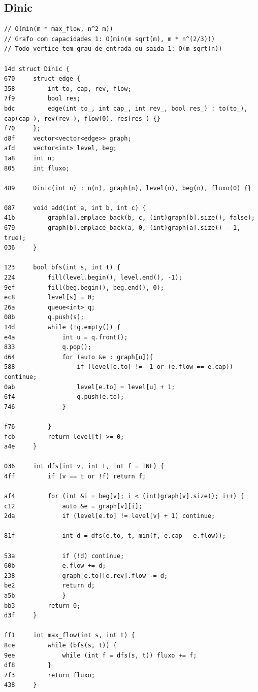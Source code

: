 \documentclass[11pt, a4paper, twoside]{article}
\begin{document}
\subsection{Dinic}
\begin{lstlisting}
// O(min(m * max_flow, n^2 m))
// Grafo com capacidades 1: O(min(m sqrt(m), m * n^(2/3)))
// Todo vertice tem grau de entrada ou saida 1: O(m sqrt(n))

14d struct Dinic {
670     struct edge { 
358         int to, cap, rev, flow;
7f9         bool res; 
bdc         edge(int to_, int cap_, int rev_, bool res_) : to(to_), cap(cap_), rev(rev_), flow(0), res(res_) {}
f70     };
d8f     vector<vector<edge>> graph;
afd     vector<int> level, beg;
1a8     int n;
805     int fluxo;
     
489     Dinic(int n) : n(n), graph(n), level(n), beg(n), fluxo(0) {}
     
087     void add(int a, int b, int c) {
41b         graph[a].emplace_back(b, c, (int)graph[b].size(), false);
679         graph[b].emplace_back(a, 0, (int)graph[a].size() - 1, true);
036     }
     
123     bool bfs(int s, int t) {
224         fill(level.begin(), level.end(), -1);
9ef         fill(beg.begin(), beg.end(), 0);
ec8         level[s] = 0; 
26a         queue<int> q;
08b         q.push(s);
14d         while (!q.empty()) {
e4a             int u = q.front(); 
833             q.pop();
d64             for (auto &e : graph[u]){
588                 if (level[e.to] != -1 or (e.flow == e.cap)) continue;
0ab                 level[e.to] = level[u] + 1;
6f4                 q.push(e.to);
746             }
                    
f76         }
fcb         return level[t] >= 0;
a4e     }
     
036     int dfs(int v, int t, int f = INF) {
4ff         if (v == t or !f) return f;
     
af4         for (int &i = beg[v]; i < (int)graph[v].size(); i++) {
c12             auto &e = graph[v][i];
2da             if (level[e.to] != level[v] + 1) continue;
     
81f             int d = dfs(e.to, t, min(f, e.cap - e.flow));
                
53a             if (!d) continue; 
60b             e.flow += d;
238             graph[e.to][e.rev].flow -= d;
be2             return d;
a5b             }
bb3         return 0;
d3f     }
     
ff1     int max_flow(int s, int t) {
8ce         while (bfs(s, t)) {
9ee             while (int f = dfs(s, t)) fluxo += f;
df8         }
7f3         return fluxo;
438     }
     

\end{lstlisting}
\end{document}
